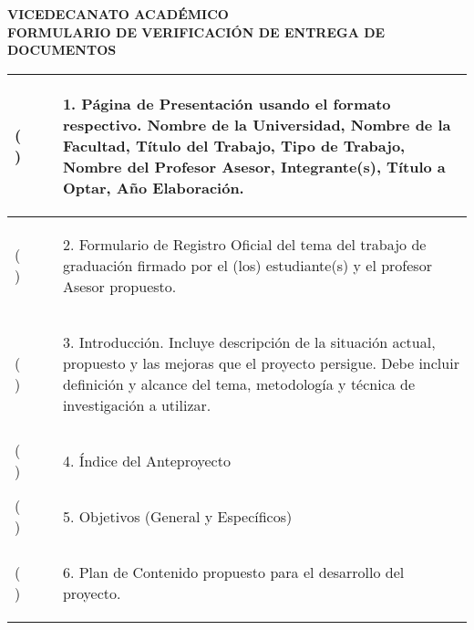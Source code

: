\newpage
{}
{\bfseries \centering
\Universidad \\
\Facultad \\
VICEDECANATO ACADÉMICO \\
FORMULARIO DE VERIFICACIÓN DE ENTREGA DE DOCUMENTOS}

\vfill
{
\renewcommand{\arraystretch}{1.7}
\begin{tabularx}{\textwidth}{|s|b|}
  \hline
  ( ) & \begin{enumerate} \item[1.] Página de Presentación usando el formato respectivo. Nombre de la Universidad, Nombre de la Facultad, Título del Trabajo, Tipo de Trabajo, Nombre del Profesor Asesor, Integrante(s), Título a Optar, Año Elaboración. \end{enumerate} \\
  \hline
  ( ) & \begin{enumerate} \item[2.] Formulario de Registro Oficial del tema del trabajo de graduación firmado por el (los) estudiante(s) y el profesor Asesor propuesto. \end{enumerate} \\
  \hline
  ( ) & \begin{enumerate} \item[3.] Introducción. Incluye descripción de la situación actual, propuesto y las mejoras que el proyecto persigue. Debe incluir definición y alcance del tema, metodología y técnica de investigación a utilizar. \end{enumerate} \\
  \hline
  ( ) & \begin{enumerate} \item[4.] Índice del Anteproyecto \end{enumerate} \\
  \hline
  ( ) & \begin{enumerate} \item[5.] Objetivos (General y Específicos) \end{enumerate} \\
  \hline
  ( ) & \begin{enumerate} \item[6.] Plan de Contenido propuesto para el desarrollo del proyecto. \end{enumerate} \\

\end{tabularx}}
